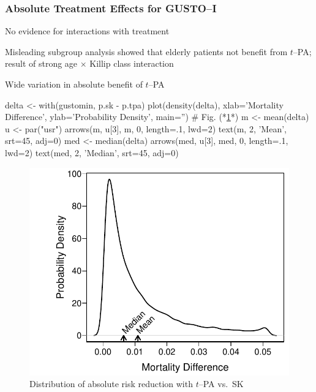 \subsubsection{Absolute Treatment Effects for GUSTO--I}
\bi
\item   No evidence for interactions with treatment
\item   Misleading subgroup analysis showed that elderly patients not benefit from $t$--PA; result of strong age $\times$ Killip class interaction
\item   Wide variation in absolute benefit of $t$--PA \ipacue
\begin{Schunk}
\begin{Sinput}
delta <- with(gustomin, p.sk - p.tpa)
plot(density(delta), xlab='Mortality Difference',
     ylab='Probability Density', main='')    # Fig. (*\ref{fig:ancova-gusto-histdelt}*)
m <- mean(delta)
u <- par("usr")
arrows(m, u[3], m, 0, length=.1, lwd=2)
text(m, 2, 'Mean', srt=45, adj=0)
med <- median(delta)
arrows(med, u[3], med, 0, length=.1, lwd=2)
text(med, 2, 'Median', srt=45, adj=0)
\end{Sinput}
\begin{figure}[htbp]

\centerline{\includegraphics[width=\maxwidth]{ancova-gusto-histdelt-1} }

\caption[Absolute benefit vs.\ baseline risk]{Distribution of absolute risk reduction with $t$--PA vs.\ SK}\label{fig:ancova-gusto-histdelt}
\end{figure}
\end{Schunk}
